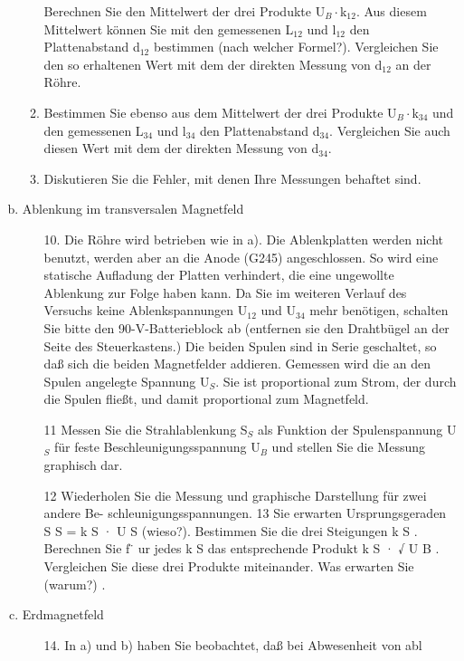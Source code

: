 \documentclass[12pt]{scrartcl}
\begin{document}
\begin{enumerate}[(a)]
\begin{enumerate}
Berechnen Sie den Mittelwert der drei Produkte U$_B\cdot$k$_{12}$. Aus diesem Mittelwert können Sie mit den gemessenen L$_{12}$ und l$_{12}$ den Plattenabstand d$_{12}$ bestimmen (nach welcher Formel?). Vergleichen Sie den so erhaltenen Wert mit dem der direkten Messung von d$_{12}$ an der Röhre.
\item
Bestimmen Sie ebenso aus dem Mittelwert der drei Produkte U$_B\cdot$k$_{34}$ und den
gemessenen L$_{34}$ und l$_{34}$ den Plattenabstand d$_{34}$. Vergleichen Sie auch diesen Wert mit dem der direkten Messung von d$_{34}$.
\item
Diskutieren Sie die Fehler, mit denen Ihre Messungen behaftet sind.
\end{enumerate}
\item Ablenkung im transversalen Magnetfeld
\newline
\begin{enumerate}
\item[10.]
Die Röhre wird betrieben wie in a). Die Ablenkplatten werden nicht benutzt, werden aber an die Anode (G245) angeschlossen. So wird eine statische Aufladung der Platten verhindert, die eine ungewollte Ablenkung zur Folge haben kann. Da Sie im weiteren Verlauf des Versuchs keine Ablenkspannungen
U$_{12}$ und U$_{34}$ mehr benötigen, schalten Sie bitte den 90-V-Batterieblock ab (entfernen sie den Drahtbügel
an der Seite des Steuerkastens.) Die beiden Spulen sind in Serie geschaltet, so daß sich die beiden Magnetfelder addieren. Gemessen wird die an den Spulen angelegte Spannung U$_S$. Sie ist proportional zum Strom, der durch die Spulen fließt, und damit proportional zum Magnetfeld.
\item[11]
Messen Sie die Strahlablenkung S$_S$ als Funktion der Spulenspannung U$_S$ für feste
Beschleunigungsspannung U$_B$
und stellen Sie die Messung graphisch dar.
\item[12]
Wiederholen Sie die Messung und graphische Darstellung für zwei andere Be-
schleunigungsspannungen.
13
Sie erwarten Ursprungsgeraden
S
S
=
k
S
·
U
S
(wieso?). Bestimmen Sie die drei
Steigungen
k
S
.
Berechnen Sie f
̈
ur jedes
k
S
das entsprechende Produkt
k
S
·
√
U
B
. Vergleichen Sie
diese drei Produkte miteinander. Was erwarten Sie (warum?)
.
\end{enumerate}
\item Erdmagnetfeld
\newline
\begin{enumerate}
\item[14.]
In a) und b) haben Sie beobachtet, daß bei Abwesenheit von abl

\end{enumerate}
\end{enumerate}
\end{document}
